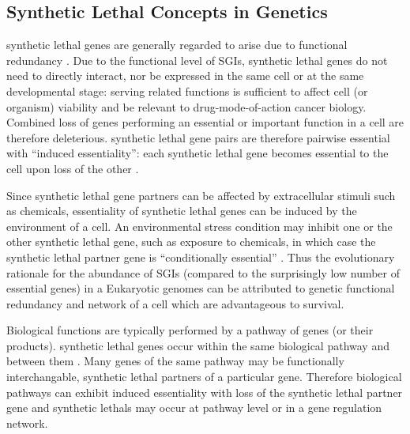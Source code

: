 \subsection{Synthetic Lethal Concepts in Genetics}

\Gls{synthetic lethal} genes are generally regarded to arise due to \gls{functional redundancy} \citep{Boone2007}. Due to the functional level of \glspl{SGI}, \gls{synthetic lethal} genes do not need to directly interact, nor be expressed in the same cell or at the same developmental stage: serving related functions is sufficient to affect cell (or organism) viability and be relevant to drug-mode-of-action cancer biology. Combined loss of genes performing an \gls{essential} or important function in a cell are therefore deleterious. \Gls{synthetic lethal} gene pairs are therefore pairwise \gls{essential} with ``\gls{induced essentiality}'': each \gls{synthetic lethal} gene becomes \gls{essential} to the cell upon loss of the other \citep{Kaelin2005, Ashworth2011}.

Since \gls{synthetic lethal} gene partners can be affected by extracellular stimuli such as chemicals, essentiality of \gls{synthetic lethal} genes can be induced by the environment of a cell.  An environmental stress condition may inhibit one or the other \gls{synthetic lethal} gene, such as exposure to chemicals, in which case the \gls{synthetic lethal} partner gene is ``conditionally essential'' \citep{Hillenmeyer2008}. Thus the evolutionary rationale for the abundance of \glspl{SGI} (compared to the surprisingly low number of \gls{essential} genes) in a Eukaryotic \glspl{genome} can be attributed to genetic \gls{functional redundancy} and network  of a cell which are advantageous to survival. 

Biological functions are typically performed by a \gls{pathway} of genes (or their products). \Gls{synthetic lethal} genes occur within the same biological \gls{pathway} and between them \citep{Kelley2005, Boone2007, Costanzo2010}. Many genes of the same \gls{pathway} may be functionally interchangable, \gls{synthetic lethal} partners of a particular gene. Therefore biological \glspl{pathway} can exhibit \gls{induced essentiality} with loss of the \gls{synthetic lethal} partner gene and \glspl{synthetic lethal} may occur at \gls{pathway} level or in a gene regulation network. 

